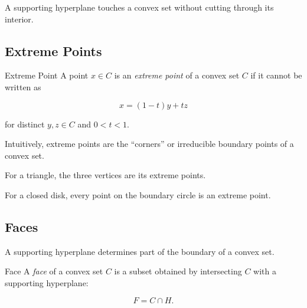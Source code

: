 A supporting hyperplane touches a convex set without cutting through its
interior.

\begin{centereddiagram}
\end{centereddiagram}

\subsection{Extreme Points}
\label{subsec:extreme-points}

\begin{definitionbox}{Extreme Point}
A point \(x\in C\) is an \emph{extreme point} of a convex set \(C\) if it
cannot be written as

\[
\boxed{
x=(1-t)y+tz
}
\]

for distinct \(y,z\in C\) and \(0<t<1\).
\end{definitionbox}

Intuitively, extreme points are the ``corners'' or irreducible boundary
points of a convex set.

For a triangle, the three vertices are its extreme points.

For a closed disk, every point on the boundary circle is an extreme point.

\subsection{Faces}
\label{subsec:convex-faces}

A supporting hyperplane determines part of the boundary of a convex set.

\begin{definitionbox}{Face}
A \emph{face} of a convex set \(C\) is a subset obtained by intersecting
\(C\) with a supporting hyperplane:

\[
\boxed{
F=C\cap H.
}
\]
\end{definitionbox}

